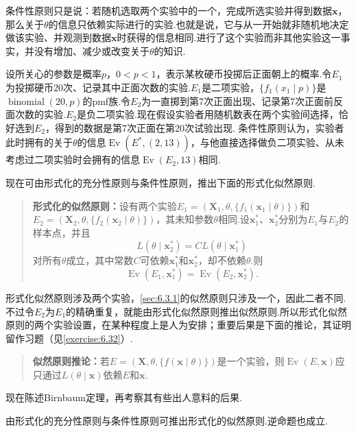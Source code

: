 条件性原则只是说：若随机选取两个实验中的一个，完成所选实验并得到数据$\boldsymbol x$，那么关于$\theta$的信息只依赖实际进行的实验.也就是说，它与从一开始就非随机地决定做该实验、并观测到数据$\boldsymbol x$时获得的信息相同.进行了这个实验而非其他实验这一事实，并没有增加、减少或改变关于$\theta$的知识.
\begin{example}[二项／负二项实验]\label{ex:6.3.5}
设所关心的参数是概率$p$，$0<p<1$，表示某枚硬币投掷后正面朝上的概率.令$E_1$为投掷硬币20次、记录其中正面次数的实验.$E_1$是二项实验，$\{f_1(x_1\mid p)\}$是$\operatorname{binomial}(20,p)$的pmf族.令$E_2$为一直掷到第7次正面出现、记录第7次正面前反面次数的实验.$E_2$是负二项实验.现在假设实验者用随机数表在两个实验间选择，恰好选到$E_2$，得到的数据是第7次正面在第20次试验出现.
条件性原则认为，实验者此时拥有的关于$\theta$的信息$\operatorname{Ev}(E^*,(2,13))$，与他直接选择做负二项实验、从未考虑过二项实验时会拥有的信息$\operatorname{Ev}(E_2,13)$相同.
\end{example}
现在可由形式化的充分性原则与条件性原则，推出下面的形式化似然原则.
\begin{quote}
\textbf{形式化的似然原则：}设有两个实验$E_1=(\boldsymbol X_1,\theta,\{f_1(\boldsymbol x_1\mid\theta)\})$和$E_2=(\boldsymbol X_2,\theta,\{f_2(\boldsymbol x_2\mid\theta)\})$，其未知参数$\theta$相同.设$\boldsymbol x_1^*$、$\boldsymbol x_2^*$分别为$E_1$与$E_2$的样本点，并且
\begin{equation}\label{eq:6.3.3}
L(\theta\mid\boldsymbol x_2^*)=CL(\theta\mid\boldsymbol x_1^*)
\end{equation}
对所有$\theta$成立，其中常数$C$可依赖$\boldsymbol x_1^*$和$\boldsymbol x_2^*$，却不依赖$\theta$.则
$$\operatorname{Ev}(E_1,\boldsymbol x_1^*)=\operatorname{Ev}(E_2,\boldsymbol x_2^*).$$
\end{quote}
形式化似然原则涉及两个实验，\autoref{sec:6.3.1}的似然原则只涉及一个，因此二者不同.不过令$E_2$为$E_1$的精确重复，就能由形式化似然原则推出似然原则.所以形式化似然原则的两个实验设置，在某种程度上是人为安排；重要后果是下面的推论，其证明留作习题（见\autoref{exercise:6.32}）.
\begin{quote}
\textbf{似然原则推论：}若$E=(\boldsymbol X,\theta,\{f(\boldsymbol x\mid\theta)\})$是一个实验，则$\operatorname{Ev}(E,\boldsymbol x)$应只通过$L(\theta\mid\boldsymbol x)$依赖$E$和$\boldsymbol x$.
\end{quote}
现在陈述Birnbaum定理，再考察其有些出人意料的后果.
\begin{theorem}[Birnbaum定理]\label{thm:6.3.6}
由形式化的充分性原则与条件性原则可推出形式化的似然原则.逆命题也成立.
\end{theorem}

